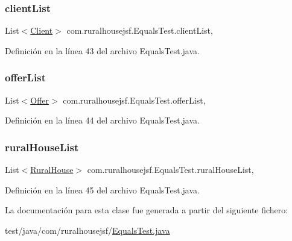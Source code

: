 \subsubsection{\texorpdfstring{clientList}{clientList}}
{\footnotesize\ttfamily List$<$\mbox{\hyperlink{a00164}{Client}}$>$ com.\+ruralhousejsf.\+Equals\+Test.\+client\+List\hspace{0.3cm}{\ttfamily [static]}, {\ttfamily [package]}}



Definición en la línea 43 del archivo Equals\+Test.\+java.

\mbox{\label{a00248_abf5b3398125f0ed991c84afb429512f4}} 
\subsubsection{\texorpdfstring{offerList}{offerList}}
{\footnotesize\ttfamily List$<$\mbox{\hyperlink{a00184}{Offer}}$>$ com.\+ruralhousejsf.\+Equals\+Test.\+offer\+List\hspace{0.3cm}{\ttfamily [static]}, {\ttfamily [package]}}



Definición en la línea 44 del archivo Equals\+Test.\+java.

\mbox{\label{a00248_a9bdc3ab9b2c103383f6c34f253fe8307}} 
\subsubsection{\texorpdfstring{ruralHouseList}{ruralHouseList}}
{\footnotesize\ttfamily List$<$\mbox{\hyperlink{a00188}{Rural\+House}}$>$ com.\+ruralhousejsf.\+Equals\+Test.\+rural\+House\+List\hspace{0.3cm}{\ttfamily [static]}, {\ttfamily [package]}}



Definición en la línea 45 del archivo Equals\+Test.\+java.



La documentación para esta clase fue generada a partir del siguiente fichero\+:\begin{DoxyCompactItemize}
\item 
test/java/com/ruralhousejsf/\mbox{\hyperlink{a00092}{Equals\+Test.\+java}}\end{DoxyCompactItemize}
